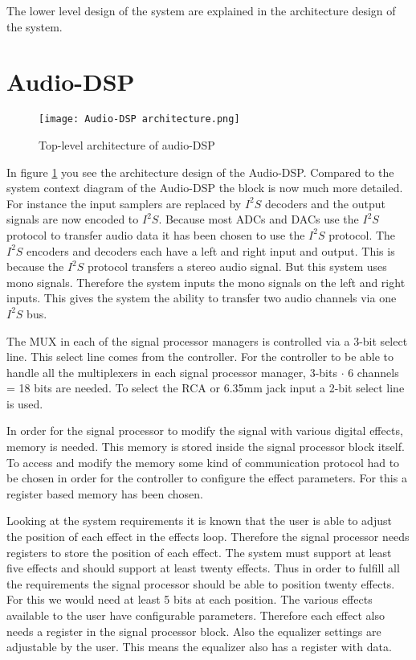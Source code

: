 The lower level design of the system are explained in the architecture design of the system. 

\section{Audio-DSP}
\begin{figure}[ht]
    \texttt{[image: Audio-DSP architecture.png]}\\    
    \caption{Top-level architecture of audio-DSP}
    \label{fig:arch-top}
\end{figure}

In figure \ref*{fig:arch-top} you see the architecture design of the Audio-DSP. 
Compared to the system context diagram of the Audio-DSP the block is now much more detailed.
For instance the input samplers are replaced by $I^2S$ decoders and the output signals are now encoded to $I^2S$.
Because most ADCs and DACs use the $I^2S$ protocol to transfer audio data it has been chosen to use the $I^2S$ protocol.
The $I^2S$ encoders and decoders each have a left and right input and output.
This is because the $I^2S$ protocol transfers a stereo audio signal.
But this system uses mono signals. Therefore the system inputs the mono signals on the left and right inputs.
This gives the system the ability to transfer two audio channels via one $I^2S$ bus.

The MUX in each of the signal processor managers is controlled via a 3-bit select line.
This select line comes from the controller. 
For the controller to be able to handle all the multiplexers in each signal processor manager, 3-bits $\cdot$ 6 channels = 18 bits are needed.
To select the RCA or 6.35mm jack input a 2-bit select line is used.

In order for the signal processor to modify the signal with various digital effects, memory is needed.
This memory is stored inside the signal processor block itself. 
To access and modify the memory some kind of communication protocol had to be chosen in order for the controller to configure the effect parameters.
For this a register based memory has been chosen.

Looking at the system requirements it is known that the user is able to adjust the position of each effect in the effects loop.
Therefore the signal processor needs registers to store the position of each effect.
The system must support at least five effects and should support at least twenty effects.
Thus in order to fulfill all the requirements the signal processor should be able to position twenty effects.
For this we would need at least 5 bits at each position.
The various effects available to the user have configurable parameters.
Therefore each effect also needs a register in the signal processor block.
Also the equalizer settings are adjustable by the user.
This means the equalizer also has a register with data.

